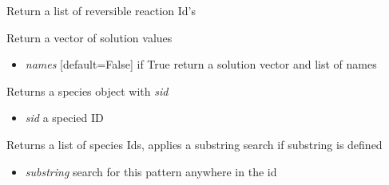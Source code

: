 \documentclass[a4paper,11pt,english]{sphinxmanual}
\begin{document}
\begin{fulllineitems}
\begin{fulllineitems}
\begin{itemize}
\end{itemize}

\end{fulllineitems}


\begin{fulllineitems}
\label{modules_doc:cbmpy.CBModel.Model.getReversibleReactionIds}
Return a list of reversible reaction Id's

\end{fulllineitems}


\begin{fulllineitems}
\label{modules_doc:cbmpy.CBModel.Model.getSolutionVector}
Return a vector of solution values
\begin{itemize}
\item {} 
\emph{names} {[}default=False{]} if True return a solution vector and list of names

\end{itemize}

\end{fulllineitems}


\begin{fulllineitems}
\label{modules_doc:cbmpy.CBModel.Model.getSpecies}
Returns a species object with \emph{sid}
\begin{itemize}
\item {} 
\emph{sid} a specied ID

\end{itemize}

\end{fulllineitems}


\begin{fulllineitems}
\label{modules_doc:cbmpy.CBModel.Model.getSpeciesIds}
Returns a list of species Ids, applies a substring search if substring is defined
\begin{itemize}
\item {} 
\emph{substring} search for this pattern anywhere in the id


\end{itemize}
\end{fulllineitems}
\end{fulllineitems}
\end{document}
